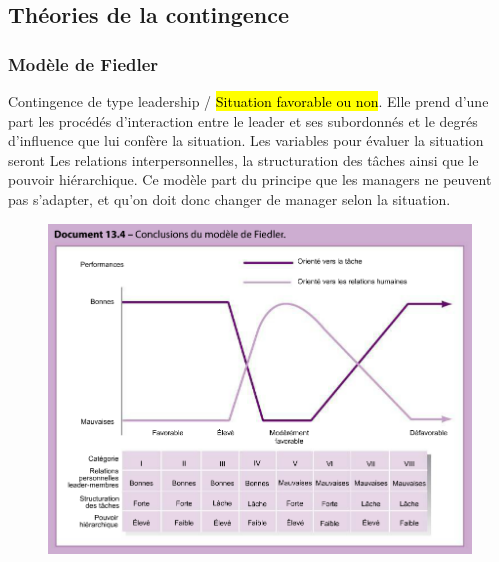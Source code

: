 \documentclass[letterpaper, 12pt]{article}
\newcommand{\alinea}{
\hspace*{0.3cm}}
\begin{document}
	\subsection{Théories de la contingence}
		\subsubsection{Modèle de Fiedler}
			\alinea Contingence de type leadership / \hl{Situation favorable ou non}. Elle prend d'une part 
			les procédés d'interaction entre le leader et ses subordonnés et le degrés d'influence que lui 
			confère la situation. Les variables pour évaluer la situation seront Les relations
			interpersonnelles, la structuration des tâches ainsi que le pouvoir hiérarchique.
			Ce modèle part du principe que les managers ne peuvent pas s'adapter, et qu'on doit donc 
			changer de manager selon la situation.
			\begin{figure}[H]
				\centering
				\includegraphics[scale=0.75]{Images/fiedler}
			\end{figure}\noindent
\end{document}
